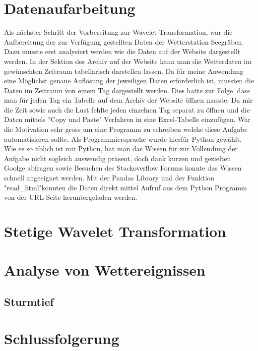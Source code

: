 \begin{refsection}
\section{Datenaufarbeitung}
Als n\"achster Schritt der Vorbereitung zur Wavelet Transformation, war die Aufbereitung der zur Verf\"ugung gestellten Daten der Wetterstation Seegr\"aben. Dazu musste erst analysiert werden wie die Daten auf der Website dargestellt werden.
In der Sektion des Archiv auf der Website kann man die Wetterdaten im gew\"unschten Zeitraum tabellarisch darstellen lassen.
Da f\"ur meine Anwendung eine M\"oglichst genaue Aufl\"osung der jeweiligen Daten erforderlich ist, mussten die Daten im Zeitraum von einem Tag dargestellt werden. Dies hatte zur Folge, dass man f\"ur jeden Tag ein Tabelle auf dem Archiv der Website \"offnen musste. Da mir die Zeit sowie auch die Lust fehlte jeden einzelnen Tag separat zu \"offnen und die Daten mittels "Copy und Paste" Verfahren in eine Excel-Tabelle einzuf\"ugen. War die Motivation sehr gross um eine Programm zu schreiben welche diese Aufgabe automatisieren sollte. Als Programmiersprache wurde hierf\"ur Python gewählt.
Wie es so üblich ist mit Python, hat man das Wissen für zur Vollendung der Aufgabe nicht sogleich auswendig präsent, doch dank kurzen und gezielten Goolge abfragen sowie Besuchen des Stackoverflow Forums konnte das Wissen schnell angeeignet werden. Mit der Pandas Library und der Funktion "read\_html"\space konnten die Daten direkt mittel Aufruf aus dem Python Programm von der URL-Seite heruntergeladen werden.




\section{Stetige Wavelet Transformation}

\section{Analyse von Wettereignissen}

\subsection{Sturmtief}


\section{Schlussfolgerung}

\printbibliography[heading=subbibliography]
\end{refsection}
